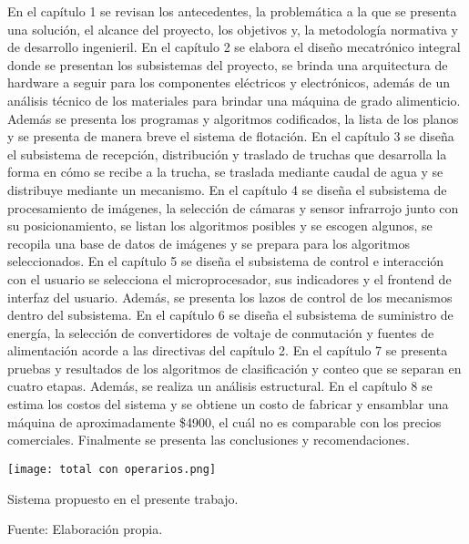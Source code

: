  En el capítulo 1 se revisan los antecedentes, la problemática a la que se presenta una solución, el alcance del proyecto, los objetivos y, la metodología normativa y de desarrollo ingenieril. En el capítulo 2 se elabora el diseño mecatrónico integral donde se presentan los subsistemas del proyecto, se brinda una arquitectura de hardware a seguir para los componentes eléctricos y electrónicos, además de un análisis técnico de los materiales para brindar una máquina de grado alimenticio. Además se presenta los programas y algoritmos codificados, la lista de los planos y se presenta de manera breve el sistema de flotación. En el capítulo 3 se diseña el subsistema de recepción, distribución y traslado de truchas que desarrolla la forma en cómo se recibe a la trucha, se traslada mediante caudal de agua y se distribuye mediante un mecanismo. En el capítulo 4 se diseña el subsistema de procesamiento de imágenes, la selección de cámaras y sensor infrarrojo junto con su posicionamiento, se listan los algoritmos posibles y se escogen algunos, se recopila una base de datos de imágenes y se prepara para los algoritmos seleccionados. En el capítulo 5 se diseña el subsistema de control e interacción con el usuario se selecciona el microprocesador, sus indicadores y el frontend de interfaz del usuario. Además, se presenta los lazos de control de los mecanismos dentro del subsistema. En el capítulo 6 se diseña el subsistema de suministro de energía, la selección de convertidores de voltaje de conmutación y fuentes de alimentación acorde a las directivas del capítulo 2. En el capítulo 7 se presenta pruebas y resultados de los algoritmos de clasificación y conteo que se separan en cuatro etapas. Además, se realiza un análisis estructural. En el capítulo 8 se estima los costos del sistema y se obtiene un costo de fabricar y ensamblar una máquina de aproximadamente \$4900, el cuál no es comparable con los precios comerciales. Finalmente se presenta las conclusiones y recomendaciones.



\begin{myfigure}[H]
	\centering
	\texttt{[image: total con operarios.png]}
	\caption{Sistema propuesto en el presente trabajo.}
	\begin{myflushcenter}
		Fuente: Elaboración propia.
	\end{myflushcenter}
	\label{fig:total con operarios}
\end{myfigure}